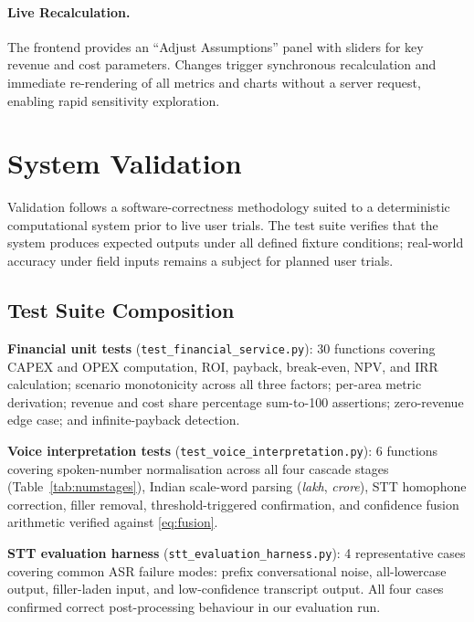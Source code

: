 \documentclass[runningheads]{llncs}
\begin{document}
\paragraph{Live Recalculation.}
The frontend provides an ``Adjust Assumptions'' panel with sliders
for key revenue and cost parameters. Changes trigger synchronous
recalculation and immediate re-rendering of all metrics and charts
without a server request, enabling rapid sensitivity exploration.


\section{System Validation}
\label{sec:eval}

Validation follows a software-correctness methodology suited to a
deterministic computational system prior to live user trials. The test
suite verifies that the system produces expected outputs under all
defined fixture conditions; real-world accuracy under field inputs
remains a subject for planned user trials.

\subsection{Test Suite Composition}

\noindent\textbf{Financial unit tests}
(\texttt{test\_financial\_service.py}): 30 functions covering CAPEX
and OPEX computation, ROI, payback, break-even, NPV, and IRR
calculation; scenario monotonicity across all three factors; per-area
metric derivation; revenue and cost share percentage sum-to-100
assertions; zero-revenue edge case; and infinite-payback detection.

\smallskip
\noindent\textbf{Voice interpretation tests}
(\texttt{test\_voice\_interpretation.py}): 6 functions covering
spoken-number normalisation across all four cascade stages
(Table~\ref{tab:numstages}), Indian scale-word parsing (\emph{lakh},
\emph{crore}), STT homophone correction, filler removal,
threshold-triggered confirmation, and confidence fusion arithmetic
verified against \eqref{eq:fusion}.

\smallskip
\noindent\textbf{STT evaluation harness}
(\texttt{stt\_evaluation\_harness.py}): 4 representative cases
covering common ASR failure modes: prefix conversational noise,
all-lowercase output, filler-laden input, and low-confidence
transcript output. All four cases confirmed correct post-processing
behaviour in our evaluation run.
\end{document}
